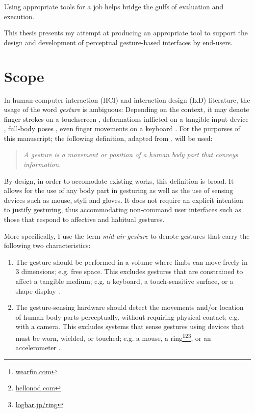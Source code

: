 Using appropriate tools for a job helps bridge the gulfs of evaluation and execution.

This thesis presents my attempt at producing an appropriate tool to support the design and development of perceptual gesture-based interfaces by end-users.

\section{Scope} %

In human-computer interaction (HCI) and interaction design (IxD) literature, the usage of the word \emph{gesture} is ambiguous: Depending on the context, it may denote finger strokes on a touchscreen \parencite{Lu:2013}, deformations inflicted on a tangible input device \parencite{Warren:2013}, full-body poses \parencite{Walter:2013}, even finger movements on a keyboard \parencite{Zhang:2014}. For the purporses of this manuscript; the following definition, adapted from \cite{Kurtenbach:1990}, will be used:

\begin{quote}
\emph{A gesture is a movement or position of a human body part that conveys information.}
\end{quote}

By design, in order to accomodate existing works, this definition is broad. It allows for the use of any body part in gesturing as well as the use of sensing devices such as mouse, styli and gloves. It does not require an explicit intention to justify gesturing, thus accommodating non-command user interfaces \parencite{Nielsen:1993} such as those that respond to affective \parencite{Kapur:2005} and habitual \parencite{Liu:2009} gestures.

More specifically, I use the term \emph{mid-air gesture} to denote gestures that carry the following two characteristics:

\begin{enumerate}
\item The gesture should be performed in a volume where limbs can move freely in 3 dimensions; e.g. free space. This excludes gestures that are constrained to affect a tangible medium; e.g. a keyboard, a touch-sensitive surface, or a shape display \parencite{Follmer:2013}.
\item The gesture-sensing hardware should detect the movements and/or location of human body parts perceptually, without requiring physical contact; e.g. with a camera. This excludes systems that sense gestures using devices that must be worn, wielded, or touched; e.g. a mouse, a ring\footnote{\href{http://www.wearfin.com/}{wearfin.com}}\footnote{\href{https://www.hellonod.com/}{hellonod.com}}\footnote{\href{http://logbar.jp/ring/}{logbar.jp/ring}}, or an accelerometer \parencite{Kela:2006, Ashbrook:2010}.
\end{enumerate}

